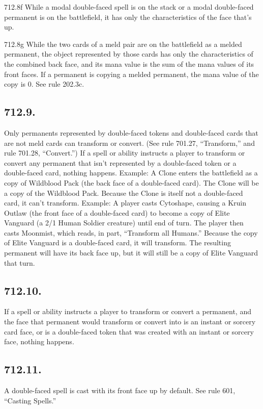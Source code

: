 712.8f While a modal double-faced spell is on the stack or a modal double-faced permanent is on the battlefield, it has only the characteristics of the face that’s up.

712.8g While the two cards of a meld pair are on the battlefield as a melded permanent, the object represented by those cards has only the characteristics of the combined back face, and its mana value is the sum of the mana values of its front faces. If a permanent is copying a melded permanent, the mana value of the copy is 0. See rule 202.3c.

\subsection*{712.9.}
Only permanents represented by double-faced tokens and double-faced cards that are not meld cards can transform or convert. (See rule 701.27, “Transform,” and rule 701.28, “Convert.”) If a spell or ability instructs a player to transform or convert any permanent that isn’t represented by a double-faced token or a double-faced card, nothing happens.
Example: A Clone enters the battlefield as a copy of Wildblood Pack (the back face of a double-faced card). The Clone will be a copy of the Wildblood Pack. Because the Clone is itself not a double-faced card, it can’t transform.
Example: A player casts Cytoshape, causing a Kruin Outlaw (the front face of a double-faced card) to become a copy of Elite Vanguard (a 2/1 Human Soldier creature) until end of turn. The player then casts Moonmist, which reads, in part, “Transform all Humans.” Because the copy of Elite Vanguard is a double-faced card, it will transform. The resulting permanent will have its back face up, but it will still be a copy of Elite Vanguard that turn.

\subsection*{712.10.}
If a spell or ability instructs a player to transform or convert a permanent, and the face that permanent would transform or convert into is an instant or sorcery card face, or is a double-faced token that was created with an instant or sorcery face, nothing happens.

\subsection*{712.11.}
A double-faced spell is cast with its front face up by default. See rule 601, “Casting Spells.”


